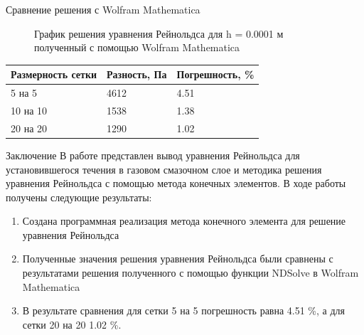 \documentclass[ignoreonframetext,unicode]{beamer}
\begin{document}
\begin{frame}{Сравнение решения с Wolfram Mathematica}
	\vspace*{-4mm}
	\begin{figure}[!htbp]
		\caption{График решения уравнения Рейнольдса для h = 0.0001 м полученный с помощью Wolfram Mathematica}
		\label{exactSolutionConst}
	\end{figure}

\begin{table}[!htbp]
	\begin{tabular}{|l|l|l|}
		\hline
		\multicolumn{1}{|c|}{Размерность сетки} & \multicolumn{1}{c|}{Разность, Па} & Погрешность, \% \\ \hline
		5 на 5                                  & 4612                              & 4.51            \\ \hline
		10 на 10                                & 1538                              & 1.38            \\ \hline
		20 на 20                                & 1290                              & 1.02            \\ \hline
	\end{tabular}
\end{table}
\end{frame}

\begin{frame}{Заключение}
	В работе представлен вывод уравнения Рейнольдса для установившегося течения в газовом смазочном слое и методика решения уравнения Рейнольдса с помощью метода конечных элементов. В ходе работы получены следующие результаты:
	\begin{block}{}
	\begin{enumerate}	
		\item Создана программная реализация метода конечного элемента для решение уравнения Рейнольдса
		\item Полученные значения решения уравнения Рейнольдса были сравнены с результатами решения полученного с помощью функции NDSolve в Wolfram Mathematica
		\item В результате сравнения для сетки 5 на 5 погрешность равна 4.51 \%, а для сетки 20 на 20 1.02 \%.
	\end{enumerate}
	\end{block}	
\end{frame}	
\end{document}
